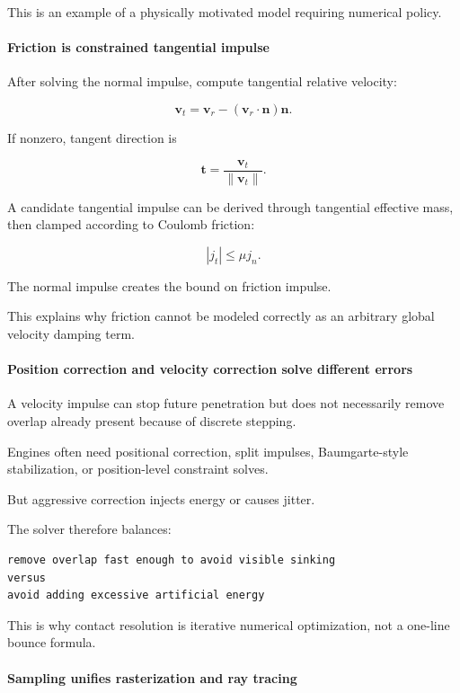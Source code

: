 This is an example of a physically motivated model requiring numerical policy.

\paragraph{Friction is constrained tangential impulse}\label{friction-is-constrained-tangential-impulse}

After solving the normal impulse, compute tangential relative velocity:

\[
\mathbf v_t
=
\mathbf v_r
-
(\mathbf v_r\cdot\mathbf n)\mathbf n.
\]

If nonzero, tangent direction is

\[
\mathbf t=
\frac{\mathbf v_t}{\|\mathbf v_t\|}.
\]

A candidate tangential impulse can be derived through tangential effective mass, then clamped according to Coulomb friction:

\[
|j_t|
\le
\mu j_n.
\]

The normal impulse creates the bound on friction impulse.

This explains why friction cannot be modeled correctly as an arbitrary global velocity damping term.

\paragraph{Position correction and velocity correction solve different errors}\label{position-correction-and-velocity-correction-solve-different-errors}

A velocity impulse can stop future penetration but does not necessarily remove overlap already present because of discrete stepping.

Engines often need positional correction, split impulses, Baumgarte-style stabilization, or position-level constraint solves.

But aggressive correction injects energy or causes jitter.

The solver therefore balances:

\begin{verbatim}
remove overlap fast enough to avoid visible sinking
versus
avoid adding excessive artificial energy
\end{verbatim}

This is why contact resolution is iterative numerical optimization, not a one-line bounce formula.

\paragraph{Sampling unifies rasterization and ray tracing}\label{sampling-unifies-rasterization-and-ray-tracing}

